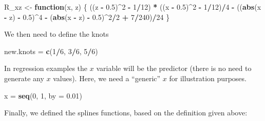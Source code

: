 \documentclass[
]{book}
\newenvironment{Shaded}{\begin{snugshade}}{\end{snugshade}}
\newcommand{\AttributeTok}[1]{\textcolor[rgb]{0.13,0.29,0.53}{#1}}
\newcommand{\ControlFlowTok}[1]{\textcolor[rgb]{0.13,0.29,0.53}{\textbf{#1}}}
\newcommand{\DecValTok}[1]{\textcolor[rgb]{0.00,0.00,0.81}{#1}}
\newcommand{\FloatTok}[1]{\textcolor[rgb]{0.00,0.00,0.81}{#1}}
\newcommand{\FunctionTok}[1]{\textcolor[rgb]{0.13,0.29,0.53}{\textbf{#1}}}
\newcommand{\NormalTok}[1]{#1}
\newcommand{\OtherTok}[1]{\textcolor[rgb]{0.56,0.35,0.01}{#1}}
\newcommand{\SpecialCharTok}[1]{\textcolor[rgb]{0.81,0.36,0.00}{\textbf{#1}}}
\begin{document}
\begin{Shaded}
\begin{Highlighting}[]
\NormalTok{R\_xz }\OtherTok{\textless{}{-}} \ControlFlowTok{function}\NormalTok{(x, z) \{}
\NormalTok{    ((z }\SpecialCharTok{{-}} \FloatTok{0.5}\NormalTok{)}\SpecialCharTok{\^{}}\DecValTok{2} \SpecialCharTok{{-}} \DecValTok{1}\SpecialCharTok{/}\DecValTok{12}\NormalTok{) }\SpecialCharTok{*}\NormalTok{ ((x }\SpecialCharTok{{-}} \FloatTok{0.5}\NormalTok{)}\SpecialCharTok{\^{}}\DecValTok{2} \SpecialCharTok{{-}} \DecValTok{1}\SpecialCharTok{/}\DecValTok{12}\NormalTok{)}\SpecialCharTok{/}\DecValTok{4} \SpecialCharTok{{-}}\NormalTok{ ((}\FunctionTok{abs}\NormalTok{(x }\SpecialCharTok{{-}}
\NormalTok{        z) }\SpecialCharTok{{-}} \FloatTok{0.5}\NormalTok{)}\SpecialCharTok{\^{}}\DecValTok{4} \SpecialCharTok{{-}}\NormalTok{ (}\FunctionTok{abs}\NormalTok{(x }\SpecialCharTok{{-}}\NormalTok{ z) }\SpecialCharTok{{-}} \FloatTok{0.5}\NormalTok{)}\SpecialCharTok{\^{}}\DecValTok{2}\SpecialCharTok{/}\DecValTok{2} \SpecialCharTok{+} \DecValTok{7}\SpecialCharTok{/}\DecValTok{240}\NormalTok{)}\SpecialCharTok{/}\DecValTok{24}
\NormalTok{\}}
\end{Highlighting}
\end{Shaded}

We then need to define the knots

\begin{Shaded}
\begin{Highlighting}[]
\NormalTok{new.knots }\OtherTok{=} \FunctionTok{c}\NormalTok{(}\DecValTok{1}\SpecialCharTok{/}\DecValTok{6}\NormalTok{, }\DecValTok{3}\SpecialCharTok{/}\DecValTok{6}\NormalTok{, }\DecValTok{5}\SpecialCharTok{/}\DecValTok{6}\NormalTok{)}
\end{Highlighting}
\end{Shaded}

In regression examples the \(x\) variable will be the predictor (there is no need to generate any \(x\) values). Here, we need a ``generic'' \(x\) for illustration purposes.

\begin{Shaded}
\begin{Highlighting}[]
\NormalTok{x }\OtherTok{=} \FunctionTok{seq}\NormalTok{(}\DecValTok{0}\NormalTok{, }\DecValTok{1}\NormalTok{, }\AttributeTok{by =} \FloatTok{0.01}\NormalTok{)}
\end{Highlighting}
\end{Shaded}

Finally, we defined the splines functions, based on the definition given above:
\end{document}
